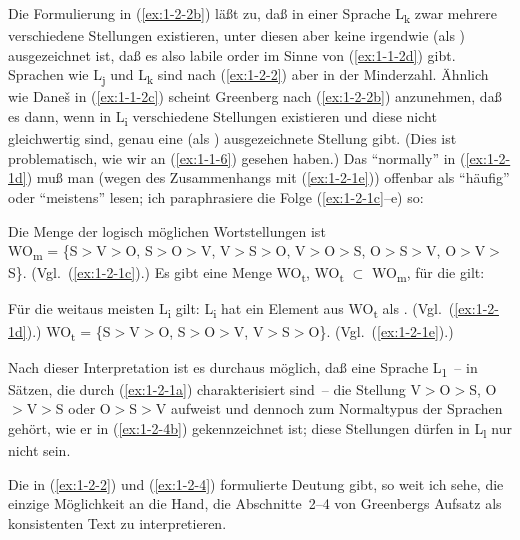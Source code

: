 \documentclass[output=paper]{langsci/langscibook}
\begin{document}
Die Formulierung in (\ref{ex:1-2-2b}) läßt zu, daß in einer Sprache L\textsubscript{k} zwar mehrere verschiedene Stellungen existieren, unter diesen aber keine irgendwie (\zb als )
ausgezeichnet ist, daß es also labile order im Sinne von (\ref{ex:1-1-2d}) gibt. Sprachen wie L\textsubscript{j} und L\textsubscript{k}
sind nach (\ref{ex:1-2-2}) aber in der Minderzahl. Ähnlich wie Dane\v{s} in (\ref{ex:1-1-2c}) scheint Greenberg
nach (\ref{ex:1-2-2b}) anzunehmen, daß es dann, wenn in L\textsubscript{i} verschiedene Stellungen existieren
und diese nicht gleichwertig sind, genau eine (als ) ausgezeichnete Stellung
gibt. (Dies ist problematisch, wie wir an (\ref{ex:1-1-6}) gesehen haben.)
Das "`normally"' in (\ref{ex:1-2-1d}) muß man (wegen des Zusammenhangs mit (\ref{ex:1-2-1e})) offenbar als "`häufig"' oder "`meistens"' lesen; ich paraphrasiere die Folge (\ref{ex:1-2-1c}–e) so:
\begin{exe}
\ex\label{ex:1-2-4}
\begin{xlist}
\ex\label{ex:1-2-4a} Die Menge der logisch möglichen Wortstellungen ist \\
WO\textsubscript{m} = \{S$>$V$>$O, S$>$O$>$V, V$>$S$>$O, V$>$O$>$S, O$>$S$>$V, O$>$V$>$S\}. (Vgl.\ (\ref{ex:1-2-1c}).)
\ex\label{ex:1-2-4b} Es gibt eine Menge WO\textsubscript{t}, WO\textsubscript{t} $\subset$ WO\textsubscript{m}, für die gilt:
\begin{xlist}
\ex\label{ex:1-2-4bi} Für die weitaus meisten L\textsubscript{i} gilt:
L\textsubscript{i} hat ein Element aus WO\textsubscript{t} als . (Vgl.\ (\ref{ex:1-2-1d}).)
\ex\label{ex:1-2-4bii} WO\textsubscript{t} = \{S$>$V$>$O, S$>$O$>$V, V$>$S$>$O\}. (Vgl.\ (\ref{ex:1-2-1e}).)
\end{xlist}
\end{xlist}
\end{exe}
Nach dieser Interpretation ist es durchaus möglich, daß eine Sprache L\textsubscript{1}~-- in Sätzen,
die durch (\ref{ex:1-2-1a}) charakterisiert sind~-- die Stellung V$>$O$>$S, O$>$V$>$S oder O$>$S$>$V
aufweist und dennoch zum Normaltypus der Sprachen gehört, wie er in (\ref{ex:1-2-4b}) gekennzeichnet ist; diese Stellungen dürfen in L\textsubscript{l} nur nicht  sein.

Die in (\ref{ex:1-2-2}) und (\ref{ex:1-2-4}) formulierte Deutung gibt, so weit ich sehe, die einzige Möglichkeit an die Hand, die Abschnitte~2–4 von Greenbergs Aufsatz als konsistenten Text
zu interpretieren.
\end{document}
